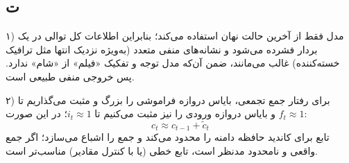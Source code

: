 \subsection*{ت}
۱) مدل فقط از آخرین حالت نهان  استفاده می‌کند؛ بنابراین اطلاعات کل توالی در یک بردار فشرده می‌شود و نشانه‌های منفی متعدد (به‌ویژه نزدیک انتها مثل ترافیک خسته‌کننده) غالب می‌مانند، ضمن آن‌که مدل توجه و تفکیک «فیلم» از «شام» ندارد. پس خروجی منفی طبیعی است.

۲) برای رفتار جمع تجمعی، بایاس دروازه فراموشی را بزرگ و مثبت می‌گذاریم تا $f_t \approx 1$ و بایاس دروازه ورودی را نیز مثبت می‌کنیم تا $i_t \approx 1$؛ در این صورت:
$$c_t \approx c_{t-1} + \tilde{c}_t$$
تابع  برای کاندید حافظه دامنه را محدود می‌کند و جمع را اشباع می‌سازد؛ اگر جمع واقعی و نامحدود مدنظر است، تابع خطی (یا  با کنترل مقادیر) مناسب‌تر است.
